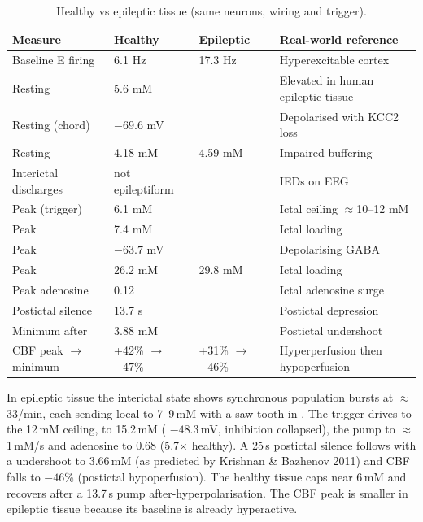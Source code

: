 \begin{table}[H]
\centering\small
\caption{Healthy vs epileptic tissue (same neurons, wiring and trigger).}
\label{tab:ionic}
\begin{tabularx}{\linewidth}{@{}l l l L@{}}
\toprule
Measure & Healthy & Epileptic & Real-world reference \\
\midrule
Baseline E firing & 6.1 Hz & 17.3 Hz & Hyperexcitable cortex \\
Resting \Cli{} & 5.6 mM &  & Elevated in human epileptic tissue \\
Resting \EGABA{} (chord) & $-69.6$ mV &  & Depolarised with KCC2 loss \\
Resting \Ko{} & 4.18 mM & 4.59 mM & Impaired buffering \\
Interictal discharges & not epileptiform &  & IEDs on EEG \\
Peak \Ko{} (trigger) & 6.1 mM &  & Ictal \Kp{} ceiling $\approx$10--12 mM \\
Peak \Cli{} & 7.4 mM &  & Ictal \Clm{} loading \\
Peak \EGABA{} & $-63.7$ mV &  & Depolarising GABA \\
Peak \Nai{} & 26.2 mM & 29.8 mM & Ictal \Nap{} loading \\
Peak adenosine & 0.12 &  & Ictal adenosine surge \\
Postictal silence & 13.7 s &  & Postictal depression \\
Minimum \Ko{} after & 3.88 mM &  & Postictal \Kp{} undershoot \\
CBF peak $\to$ minimum & +42\% $\to$ $-47$\% & +31\% $\to$ $-46$\% & Hyperperfusion then hypoperfusion \\
\bottomrule
\end{tabularx}
\end{table}

In epileptic tissue the interictal state shows synchronous population bursts at $\approx$33/min, each sending local \Ko{} to 7--9\,mM with a saw-tooth in \Cli. The trigger drives \Ko{} to the 12\,mM ceiling, \Cli{} to 15.2\,mM (\EGABA{} $-48.3$\,mV, inhibition collapsed), the pump to $\approx$1\,mM/s and adenosine to 0.68 (5.7$\times$ healthy). A 25\,s postictal silence follows with a \Kp{} undershoot to 3.66\,mM (as predicted by Krishnan \& Bazhenov 2011) and CBF falls to $-46$\% (postictal hypoperfusion). The healthy tissue caps \Ko{} near 6\,mM and recovers after a 13.7\,s pump after-hyperpolarisation. The CBF peak is smaller in epileptic tissue because its baseline is already hyperactive.

